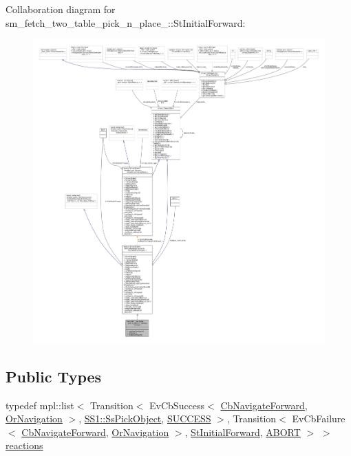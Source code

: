Collaboration diagram for sm\+\_\+fetch\+\_\+two\+\_\+table\+\_\+pick\+\_\+n\+\_\+place\+\_\+:\+:St\+Initial\+Forward\+:
\nopagebreak
\begin{figure}[H]
\begin{center}
\leavevmode
\includegraphics[width=350pt]{structsm__fetch__two__table__pick__n__place__1_1_1StInitialForward__coll__graph}
\end{center}
\end{figure}
\subsection*{Public Types}
\begin{DoxyCompactItemize}
\item 
typedef mpl\+::list$<$ Transition$<$ Ev\+Cb\+Success$<$ \hyperlink{classcl__move__base__z_1_1CbNavigateForward}{Cb\+Navigate\+Forward}, \hyperlink{classsm__fetch__two__table__pick__n__place__1_1_1OrNavigation}{Or\+Navigation} $>$, \hyperlink{structsm__fetch__two__table__pick__n__place__1_1_1SS1_1_1SsPickObject}{S\+S1\+::\+Ss\+Pick\+Object}, \hyperlink{classSUCCESS}{S\+U\+C\+C\+E\+SS} $>$, Transition$<$ Ev\+Cb\+Failure$<$ \hyperlink{classcl__move__base__z_1_1CbNavigateForward}{Cb\+Navigate\+Forward}, \hyperlink{classsm__fetch__two__table__pick__n__place__1_1_1OrNavigation}{Or\+Navigation} $>$, \hyperlink{structsm__fetch__two__table__pick__n__place__1_1_1StInitialForward}{St\+Initial\+Forward}, \hyperlink{classABORT}{A\+B\+O\+RT} $>$ $>$ \hyperlink{structsm__fetch__two__table__pick__n__place__1_1_1StInitialForward_ac3cdc1af3fb1641169c5e7367ebed93b}{reactions}
\end{DoxyCompactItemize}
